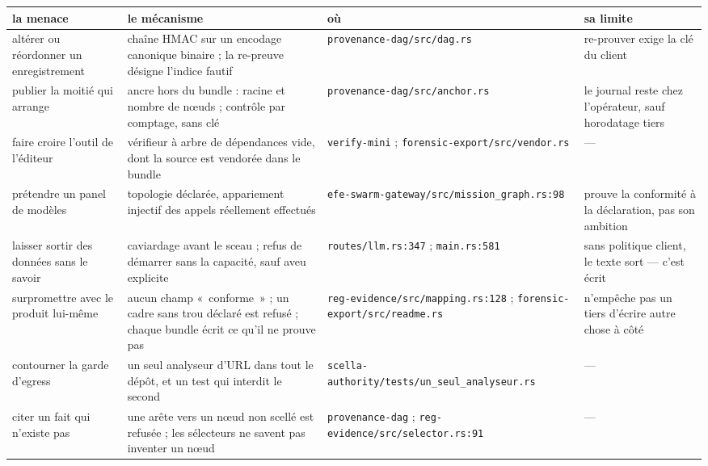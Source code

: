 \documentclass[10pt]{extarticle}
\newcommand{\loc}[1]{{\footnotesize\color{grey}\texttt{#1}}}
\begin{document}
{\small
\renewcommand{\arraystretch}{1.13}
\begin{longtable}{@{}L{3.9cm}L{6.4cm}L{3.9cm}L{3.3cm}@{}}
\toprule
\textbf{la menace} & \textbf{le mécanisme} & \textbf{où} & \textbf{sa limite} \\ \midrule \endhead
altérer ou réordonner un enregistrement & chaîne HMAC sur un encodage canonique binaire ; la re-preuve désigne
l'indice fautif & \loc{provenance-dag/\allowbreak src/\allowbreak dag.rs} & re-prouver exige la clé du client \\
publier la moitié qui arrange & ancre hors du bundle : racine et nombre de nœuds ; contrôle par comptage, sans clé &
\loc{provenance-dag/\allowbreak src/\allowbreak anchor.rs} & le journal reste chez l'opérateur, sauf horodatage tiers \\
faire croire l'outil de l'éditeur & vérifieur à arbre de dépendances vide, dont la source est vendorée dans le bundle &
\loc{verify-mini} ; \loc{forensic-export/\allowbreak src/\allowbreak vendor.rs} & --- \\
prétendre un panel de modèles & topologie déclarée, appariement injectif des appels réellement effectués &
\loc{efe-swarm-gateway/\allowbreak src/\allowbreak mission\_graph.rs:98} & prouve la conformité à la déclaration, pas
son ambition \\
laisser sortir des données sans le savoir & caviardage avant le sceau ; refus de démarrer sans la capacité, sauf aveu
explicite & \loc{routes/\allowbreak llm.rs:347} ; \loc{main.rs:581} & sans politique client, le texte sort --- c'est
écrit \\
surpromettre avec le produit lui-même & aucun champ «~conforme~» ; un cadre sans trou déclaré est refusé ; chaque
bundle écrit ce qu'il ne prouve pas & \loc{reg-evidence/\allowbreak src/\allowbreak mapping.rs:128} ;
\loc{forensic-export/\allowbreak src/\allowbreak readme.rs} & n'empêche pas un tiers d'écrire autre chose à côté \\
contourner la garde d'egress & un seul analyseur d'URL dans tout le dépôt, et un test qui interdit le second &
\loc{scella-authority/\allowbreak tests/\allowbreak un\_seul\_analyseur.rs} & --- \\
citer un fait qui n'existe pas & une arête vers un nœud non scellé est refusée ; les sélecteurs ne savent pas inventer
un nœud & \loc{provenance-dag} ; \loc{reg-evidence/\allowbreak src/\allowbreak selector.rs:91} & --- \\
\bottomrule
\end{longtable}
}
\end{document}
